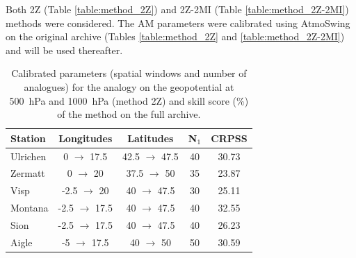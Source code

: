 \documentclass[hess]{copernicus}
\begin{document}
Both 2Z (Table \ref{table:method_2Z}) and 2Z-2MI (Table \ref{table:method_2Z-2MI}) methods were considered. The AM parameters were calibrated using AtmoSwing \citep{Horton2016} on the original archive (Tables \ref{table:method_2Z} and \ref{table:method_2Z-2MI}) and will be used thereafter.

\begin{table}[htb]
	\caption{Calibrated parameters (spatial windows and number of analogues) for the analogy on the geopotential at 500~hPa and 1000~hPa (method 2Z) and skill score (\%) of the method on the full archive.}
	\begin{center}
		\begin{tabular}{l c c c c }
			\hline
			Station & Longitudes & Latitudes & N$_{1}$ & CRPSS \\
			\hline
			Ulrichen & 0 $\rightarrow$ 17.5 & 42.5 $\rightarrow$ 47.5 & 40 & 30.73 \\
			Zermatt & 0 $\rightarrow$ 20 & 37.5 $\rightarrow$ 50 & 35 & 23.87 \\
			Visp & -2.5 $\rightarrow$ 20 & 40 $\rightarrow$ 47.5 & 30 & 25.11 \\
			Montana & -2.5 $\rightarrow$ 17.5 & 40 $\rightarrow$ 47.5 & 40 & 32.55 \\
			Sion & -2.5 $\rightarrow$ 17.5 & 40 $\rightarrow$ 47.5 & 40 & 26.23 \\
			Aigle & -5 $\rightarrow$ 17.5 & 40 $\rightarrow$ 50 & 50 & 30.59 \\ 
			\hline
		\end{tabular}
	\end{center}
	\label{table:params_2Z}
\end{table}
\end{document}
